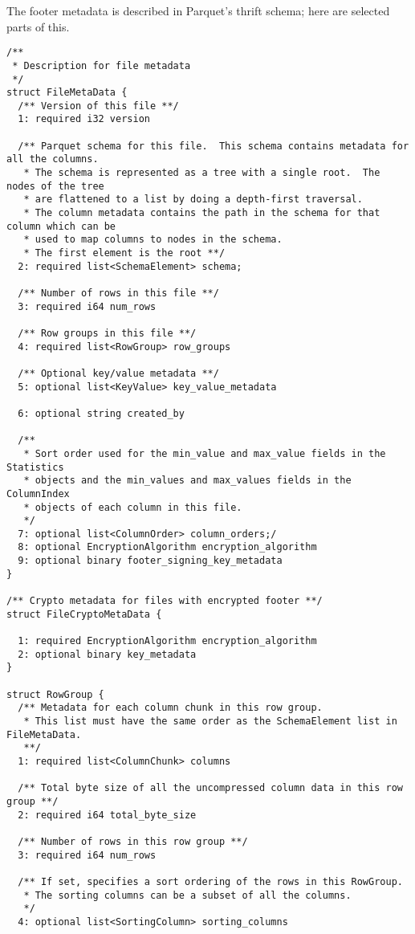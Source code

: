 \documentclass[manuscript]{acmart}
\begin{document}
The footer metadata is described in Parquet's thrift schema; here
are selected parts of this.
\begin{verbatim}
/**
 * Description for file metadata
 */
struct FileMetaData {
  /** Version of this file **/
  1: required i32 version

  /** Parquet schema for this file.  This schema contains metadata for all the columns.
   * The schema is represented as a tree with a single root.  The nodes of the tree
   * are flattened to a list by doing a depth-first traversal.
   * The column metadata contains the path in the schema for that column which can be
   * used to map columns to nodes in the schema.
   * The first element is the root **/
  2: required list<SchemaElement> schema;

  /** Number of rows in this file **/
  3: required i64 num_rows

  /** Row groups in this file **/
  4: required list<RowGroup> row_groups

  /** Optional key/value metadata **/
  5: optional list<KeyValue> key_value_metadata

  6: optional string created_by

  /**
   * Sort order used for the min_value and max_value fields in the Statistics
   * objects and the min_values and max_values fields in the ColumnIndex
   * objects of each column in this file.
   */
  7: optional list<ColumnOrder> column_orders;/
  8: optional EncryptionAlgorithm encryption_algorithm
  9: optional binary footer_signing_key_metadata
}

/** Crypto metadata for files with encrypted footer **/
struct FileCryptoMetaData {

  1: required EncryptionAlgorithm encryption_algorithm
  2: optional binary key_metadata
}

struct RowGroup {
  /** Metadata for each column chunk in this row group.
   * This list must have the same order as the SchemaElement list in FileMetaData.
   **/
  1: required list<ColumnChunk> columns

  /** Total byte size of all the uncompressed column data in this row group **/
  2: required i64 total_byte_size

  /** Number of rows in this row group **/
  3: required i64 num_rows

  /** If set, specifies a sort ordering of the rows in this RowGroup.
   * The sorting columns can be a subset of all the columns.
   */
  4: optional list<SortingColumn> sorting_columns


\end{verbatim}
\end{document}
